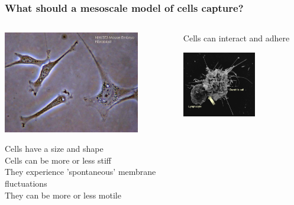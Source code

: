 \documentclass[compress]{beamer}
\begin{document}
\begin{frame}
\frametitle{What should a mesoscale model of cells capture?} 

 \begin{columns}
    \begin{column}{0.49\textwidth}
    \vspace*{-1cm}
    
    \begin{center}
     \includegraphics[width=0.8\textwidth]{figures/cellshape.png}\\
     \end{center}
     \small Cells have a size and shape\\
     \small Cells can be more or less stiff\\
     \small They experience 'spontaneous' membrane fluctuations\\
     \small They can be more or less motile\\
    \end{column}
    \begin{column}{0.49\textwidth}
    \small Cells can interact and adhere  \\
    \vspace*{-0.25cm}
    \begin{center}
  \includegraphics[width=0.6\textwidth]{figures/interactions.png}\\

\end{center}
\end{column}
\end{columns}
\end{frame}
\end{document}
